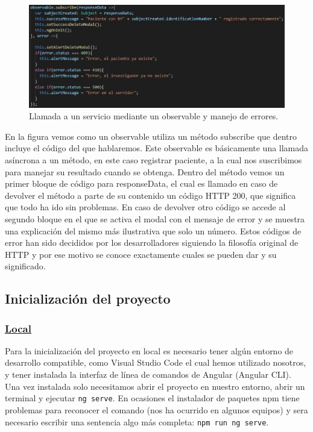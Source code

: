     \begin{figure}[h]
    \centering
    \includegraphics[width=1\textwidth]{images/observableAndErrors.jpg}
    \caption{Llamada a un servicio mediante un observable y manejo de errores.}
    \end{figure}
    \FloatBarrier
    
    En la figura vemos como un observable utiliza un método subscribe que dentro incluye el código del que hablaremos. Este observable es básicamente una llamada asíncrona a un método, en este caso registrar paciente, a la cual nos suscribimos para manejar su resultado cuando se obtenga. Dentro del método vemos un primer bloque de código para responseData, el cual es llamado en caso de devolver el método a parte de su contenido un código HTTP 200, que significa que todo ha ido sin problemas. En caso de devolver otro código se accede al segundo bloque en el que se activa el modal con el mensaje de error y se muestra una explicación del mismo más ilustrativa que solo un número. Estos códigos de error han sido decididos por los desarrolladores siguiendo la filosofía original de HTTP y por ese motivo se conoce exactamente cuales se pueden dar y su significado.\newpage
    
    \subsection{Inicialización del proyecto}
    
        \subsubsection{\underline{Local}}
        
        Para la inicialización del proyecto en local es necesario tener algún entorno de desarrollo compatible, como Visual Studio Code el cual hemos utilizado nosotros, y tener instalada la interfaz de línea de comandos de Angular (Angular CLI). Una vez instalada solo necesitamos abrir el proyecto en nuestro entorno, abrir un terminal y ejecutar \texttt{ng serve}. En ocasiones el instalador de paquetes npm tiene problemas para reconocer el comando (nos ha ocurrido en algunos equipos) y sera necesario escribir una sentencia algo más completa: \texttt{npm run ng serve}.
